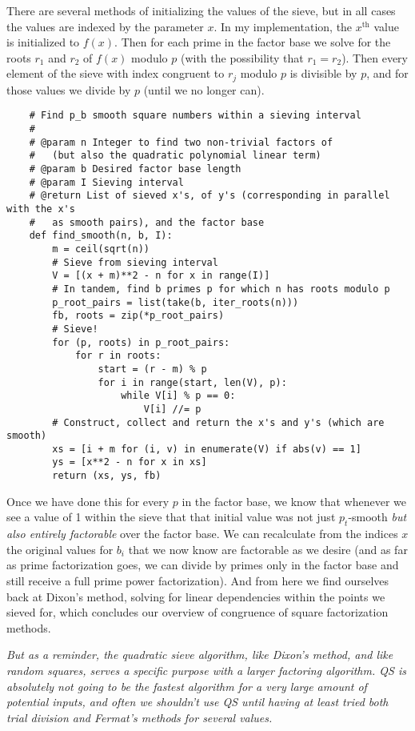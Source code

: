 \documentclass{report}
\begin{document}
There are several methods of initializing the values of the sieve, but in all cases the values are
indexed by the parameter $x$. In my implementation, the $x^\text{th}$ value is initialized
to $f(x)$. Then for each prime in the factor base we solve for the roots $r_1$ and $r_2$ of $f(x)$
modulo $p$ (with the possibility that $r_1=r_2$).
Then every element of the sieve with index congruent to $r_j$ modulo $p$ is divisible by $p$,
and for those values we divide by $p$ (until we no longer can).
\begin{verbatim}
    # Find p_b smooth square numbers within a sieving interval
    #
    # @param n Integer to find two non-trivial factors of
    #   (but also the quadratic polynomial linear term)
    # @param b Desired factor base length
    # @param I Sieving interval
    # @return List of sieved x's, of y's (corresponding in parallel with the x's
    #   as smooth pairs), and the factor base
    def find_smooth(n, b, I):
        m = ceil(sqrt(n))
        # Sieve from sieving interval
        V = [(x + m)**2 - n for x in range(I)]
        # In tandem, find b primes p for which n has roots modulo p
        p_root_pairs = list(take(b, iter_roots(n)))
        fb, roots = zip(*p_root_pairs)
        # Sieve!
        for (p, roots) in p_root_pairs:
            for r in roots:
                start = (r - m) % p
                for i in range(start, len(V), p):
                    while V[i] % p == 0:
                        V[i] //= p
        # Construct, collect and return the x's and y's (which are smooth)
        xs = [i + m for (i, v) in enumerate(V) if abs(v) == 1]
        ys = [x**2 - n for x in xs]
        return (xs, ys, fb)
\end{verbatim}
Once we have done this for every $p$ in the factor base, we know that whenever we see a value of 1
within the sieve that that initial value was not just $p_t$-smooth \emph{but also entirely
factorable} over the factor base. We can recalculate from the indices $x$ the original values for
$b_i$ that we now know are factorable as we desire (and as far as prime factorization goes, we can
divide by primes only in the factor base and still receive a full prime power factorization).
And from here we find ourselves back at Dixon's method, solving for linear dependencies within
the points we sieved for, which concludes our overview of congruence of square factorization
methods.

\emph{
    But as a reminder, the quadratic sieve algorithm, like Dixon's method, and like random squares,
    serves a specific purpose with a larger factoring algorithm. QS is absolutely not going to be the
    fastest algorithm for a very large amount of potential inputs, and often we shouldn't use
    QS until having at least tried both trial division and Fermat's methods for several values.
}
\end{document}
